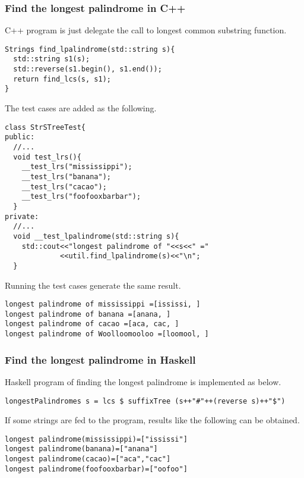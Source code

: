\documentclass{article}
\begin{document}
\subsubsection*{Find the longest palindrome in C++}
C++ program is just delegate the call to longest common substring
function.

\begin{lstlisting}
Strings find_lpalindrome(std::string s){
  std::string s1(s);
  std::reverse(s1.begin(), s1.end());
  return find_lcs(s, s1);
}
\end{lstlisting}

The test cases are added as the following.

\begin{lstlisting}
class StrSTreeTest{
public:
  //...
  void test_lrs(){
    __test_lrs("mississippi");
    __test_lrs("banana");
    __test_lrs("cacao");
    __test_lrs("foofooxbarbar");
  }
private:
  //...
  void __test_lpalindrome(std::string s){
    std::cout<<"longest palindrome of "<<s<<" ="
             <<util.find_lpalindrome(s)<<"\n";
  }
\end{lstlisting}

Running the test cases generate the same result.

\begin{verbatim}
longest palindrome of mississippi =[ississi, ]
longest palindrome of banana =[anana, ]
longest palindrome of cacao =[aca, cac, ]
longest palindrome of Woolloomooloo =[loomool, ]
\end{verbatim}

\subsubsection*{Find the longest palindrome in Haskell}
Haskell program of finding the longest palindrome is implemented as below.

\lstset{language=Haskell}
\begin{lstlisting}
longestPalindromes s = lcs $ suffixTree (s++"#"++(reverse s)++"$")
\end{lstlisting}

If some strings are fed to the program, results like the following can
be obtained.

\begin{verbatim}
longest palindrome(mississippi)=["ississi"]
longest palindrome(banana)=["anana"]
longest palindrome(cacao)=["aca","cac"]
longest palindrome(foofooxbarbar)=["oofoo"]
\end{verbatim}
\end{document}
